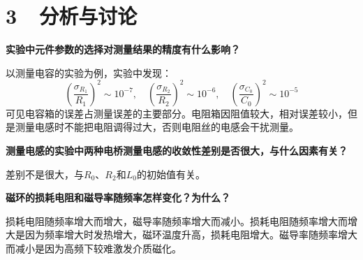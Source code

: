 \documentclass[a4paper,fontset=windows]{ctexart}
\begin{document}
    \section*{3\ \ 分析与讨论}
    \textbf{实验中元件参数的选择对测量结果的精度有什么影响？}

    以测量电容的实验为例，实验中发现：
    \[
    \left(\frac{\sigma_{R_1}}{R_1}\right)^2 \sim 10^{-7},\quad
    \left(\frac{\sigma_{R_2}}{R_2}\right)^2 \sim 10^{-6},\quad
    \left(\frac{\sigma_{C_0}}{C_0}\right)^2 \sim 10^{-5}
    \]
    可见电容箱的误差占测量误差的主要部分。电阻箱因阻值较大，相对误差较小，但是测量电感时不能把电阻调得过大，否则电阻丝的电感会干扰测量。

    \textbf{测量电感的实验中两种电桥测量电感的收敛性差别是否很大，与什么因素有关？}

    差别不是很大，与$R_0$、$R_2$和$L_0$的初始值有关。

    \textbf{磁环的损耗电阻和磁导率随频率怎样变化？为什么？}

    损耗电阻随频率增大而增大，磁导率随频率增大而减小。损耗电阻随频率增大而增大是因为频率增大时发热增大，磁环温度升高，损耗电阻增大。磁导率随频率增大而减小是因为高频下较难激发介质磁化。
\end{document}
